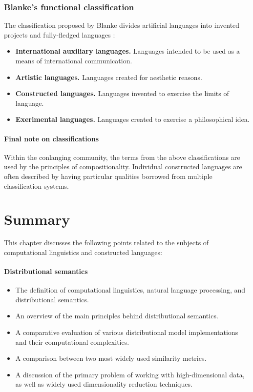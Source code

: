 \documentclass[14pt, a4paper]{extreport}
\begin{document}
      \subsubsection{Blanke's functional classification}
The classification proposed by Blanke divides artificial languages into invented projects and fully-fledged languages \parencite{stria}:

\begin{itemize}
  \item \textbf{International auxiliary languages.} Languages intended to be used as a means of international communication.
  \item \textbf{Artistic languages.} Languages created for aesthetic reasons.
  \item \textbf{Constructed languages.} Languages invented to exercise the limits of language.
  \item \textbf{Exerimental languages.} Languages created to exercise a philosophical idea.
\end{itemize}
        \bigskip
        \paragraph{Final note on classifications}
Within the conlanging community, the terms from the above classifications are used by the principles of compositionality. Individual constructed languages are often described by having particular qualities borrowed from multiple classification systems.
    \section{Summary}

This chapter discusses the following points related to the subjects of computational linguistics and constructed languages:

\paragraph{Distributional semantics}

\begin{itemize}
  \item The definition of computational linguistics, natural language processing, and distributional semantics.
  \item An overview of the main principles behind distributional semantics.
  \item A comparative evaluation of various distributional model implementations and their computational complexities.
  \item A comparison between two most widely used similarity metrics.
  \item A discussion of the primary problem of working with high-dimensional data, as well as widely used dimensionality reduction techniques.
\end{itemize}
\end{document}
